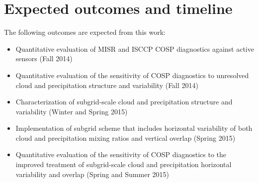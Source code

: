 \documentclass[letter]{article}
\begin{document}

\section{Expected outcomes and timeline}
The following outcomes are expected from this work:
\begin{itemize}
    \item Quantitative evaluation of MISR and ISCCP COSP diagnostics against active sensors (Fall 2014)
    \item Quantitative evaluation of the sensitivity of COSP diagnostics to unresolved cloud and precipitation structure and variability (Fall 2014)
    \item Characterization of subgrid-scale cloud and precipitation structure and variability (Winter and Spring 2015)
    \item Implementation of subgrid scheme that includes horizontal variability of both cloud and precipitation mixing ratios and vertical overlap (Spring 2015)
    \item Quantitative evaluation of the sensitivity of COSP diagnostics to the improved treatment of subgrid-scale cloud and precipitation horizontal variability and overlap (Spring and Summer 2015)
\end{itemize}
\end{document}
